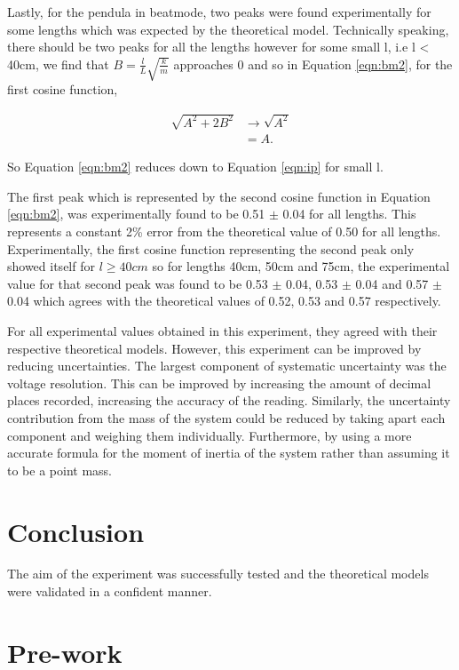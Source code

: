 \documentclass{article}
\begin{document}
Lastly, for the pendula in beatmode, two peaks were found experimentally 
for some lengths which was expected by the theoretical model. Technically 
speaking, there should be two peaks for all the lengths however for some
small l, i.e l < 40cm, we find that $B=\frac{l}{L}\sqrt{\frac{k}{m}}$ 
approaches 0 and so in Equation \ref{eqn:bm2}, for the first cosine 
function,

\begin{equation}
    \begin{split}
        \sqrt{A^2+2B^2} &\rightarrow \sqrt{A^2}\\
        &= A.
    \end{split}
\end{equation}

So Equation \ref{eqn:bm2} reduces down to Equation \ref{eqn:ip} for
small l.

The first peak which is represented by the second cosine function in
Equation \ref{eqn:bm2}, was experimentally found to be 0.51 $\pm$ 0.04 
for all lengths. This represents a constant 2\% error from the 
theoretical value of 0.50 for all lengths. Experimentally, the first
cosine function representing the second peak only showed itself for 
$l \geq 40 cm$ so for lengths 40cm, 50cm and 75cm, the experimental
value for that second peak was found to be 0.53 $\pm$ 0.04, 0.53 
$\pm$ 0.04 and 0.57 $\pm$ 0.04 which agrees with the theoretical 
values of 0.52, 0.53 and 0.57 respectively.

For all experimental values obtained in this experiment, they agreed
with their respective theoretical models. However, this experiment 
can be improved by reducing uncertainties. The largest component of
systematic uncertainty was the voltage resolution. This can be 
improved by increasing the amount of decimal places recorded, 
increasing the accuracy of the reading. Similarly, the uncertainty 
contribution from the mass of the system could be reduced by taking 
apart each component and weighing them individually. Furthermore, by
using a more accurate formula for the moment of inertia of the system
rather than assuming it to be a point mass.

\section{Conclusion}
The aim of the experiment was successfully tested and the theoretical 
models were validated in a confident manner.

\appendix
\section{Pre-work}
\end{document}

